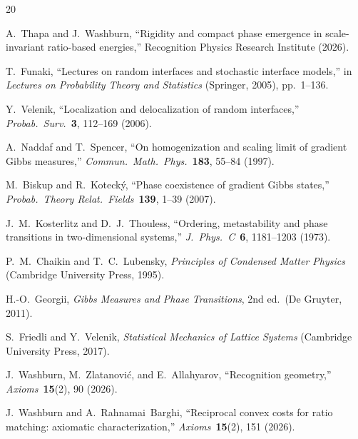 \documentclass[11pt]{article}
\theoremstyle{definition}
\begin{document}
\begin{thebibliography}{20}

 A.~Thapa and J.~Washburn, ``Rigidity and compact phase emergence in scale-invariant ratio-based energies,'' Recognition Physics Research Institute (2026).

 T.~Funaki, ``Lectures on random interfaces and stochastic interface models,'' in \textit{Lectures on Probability Theory and Statistics} (Springer, 2005), pp.~1--136.

 Y.~Velenik, ``Localization and delocalization of random interfaces,'' \textit{Probab.\ Surv.}\ \textbf{3}, 112--169 (2006).

 A.~Naddaf and T.~Spencer, ``On homogenization and scaling limit of gradient Gibbs measures,'' \textit{Commun.\ Math.\ Phys.}\ \textbf{183}, 55--84 (1997).

 M.~Biskup and R.~Koteck\'{y}, ``Phase coexistence of gradient Gibbs states,'' \textit{Probab.\ Theory Relat.\ Fields}\ \textbf{139}, 1--39 (2007).

 J.~M.~Kosterlitz and D.~J.~Thouless, ``Ordering, metastability and phase transitions in two-dimensional systems,'' \textit{J.\ Phys.\ C}\ \textbf{6}, 1181--1203 (1973).

 P.~M.~Chaikin and T.~C.~Lubensky, \textit{Principles of Condensed Matter Physics} (Cambridge University Press, 1995).

 H.-O.~Georgii, \textit{Gibbs Measures and Phase Transitions}, 2nd ed.\ (De Gruyter, 2011).

 S.~Friedli and Y.~Velenik, \textit{Statistical Mechanics of Lattice Systems} (Cambridge University Press, 2017).

 J.~Washburn, M.~Zlatanovi\'{c}, and E.~Allahyarov, ``Recognition geometry,'' \textit{Axioms}\ \textbf{15}(2), 90 (2026).

 J.~Washburn and A.~Rahnamai~Barghi, ``Reciprocal convex costs for ratio matching: axiomatic characterization,'' \textit{Axioms}\ \textbf{15}(2), 151 (2026).

\end{thebibliography}
\end{document}
